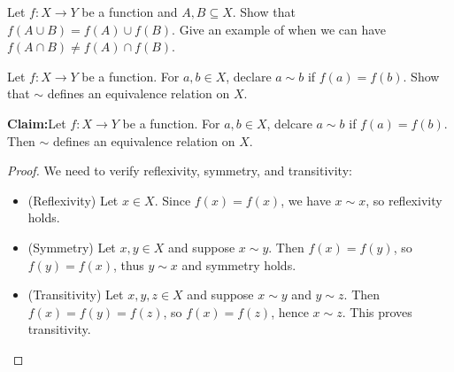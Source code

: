 \documentclass[11pt,dvipsnames]{book}
\numberwithin{figure}{section} %
\numberwithin{table}{section} %
\begin{document}
\begin{exercise}
Let $f:X\rightarrow Y$ be a function and $A,B\subseteq X$. Show that $f(A\cup B)=f(A)\cup f(B)$. Give an example of when we can have $f(A\cap B)\neq f(A)\cap f(B)$.
\end{exercise}

\begin{exercise} Let $f:X\rightarrow Y$ be a function. For $a,b\in X$, declare $a\sim b$ if $f(a)=f(b)$.
Show that $\sim$ defines an equivalence relation on $X$.

\begin{solution}
{\bf Claim:}Let $f:X\rightarrow Y$ be a function. For $a,b\in X$, delcare $a\sim b$ if $f(a)=f(b)$. Then $\sim$ defines an equivalence relation on $X$.

\begin{proof}
We need to verify reflexivity, symmetry, and transitivity:
\begin{itemize}
\item (Reflexivity) Let $x\in X$. Since $f(x)=f(x)$, we have $x\sim x$, so reflexivity holds.
\item (Symmetry) Let $x,y\in X$ and suppose $x\sim y$. Then $f(x)=f(y)$, so $f(y)=f(x)$, thus $y\sim x$ and symmetry holds.
\item (Transitivity)  Let $x,y,z\in X$ and suppose $x\sim y$ and $y\sim z$. Then $f(x)=f(y)=f(z)$, so $f(x)=f(z)$, hence $x\sim z$. This proves transitivity.
\end{itemize}
\end{proof}
\end{solution}

\end{exercise}
\end{document}
